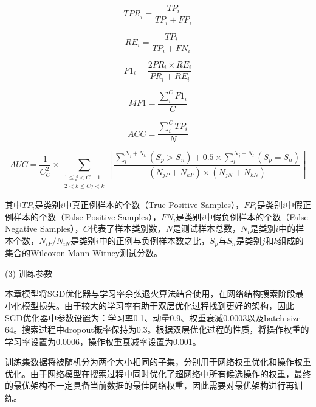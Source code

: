 \begin{equation}
    \label{deqn_ex35}
T P R_i=\frac{T P_i}{T P_i+F P_i}
\end{equation}

\begin{equation}
    \label{deqn_ex36}
R E_i=\frac{T P_i}{T P_i+F N_i}
\end{equation}

\begin{equation}
    \label{deqn_ex37}
F 1_i=\frac{2 P R_i \times R E_i}{P R_i+R E_i}
\end{equation}

\begin{equation}
    \label{deqn_ex38}
M F 1=\frac{\sum_i^C F 1_i}{C}
\end{equation}

\begin{equation}
    \label{deqn_ex39}
A C C=\frac{\sum_i^C T P_i}{N}
\end{equation}

\begin{equation}
    \label{deqn_ex310}
A U C=\frac{1}{C_C^2} \times \sum_{\substack{1 \leq j<C-1 \\ 2<k \leq C j<k}}\left[\frac{\sum_l^{N_j+N_k}\left(S_p>S_n\right)+0.5 \times \sum_l^{N_j+N_l}\left(S_p=S_n\right)}{\left(N_{j P}+N_{k P}\right) \times\left(N_{j N}+N_{k N}\right)}\right]
\end{equation}

\vspace{5mm}


其中$T P_i$是类别$i$中真正例样本的个数（True Positive Samples），$F P_i$是类别$i$中假正例样本的个数（False Positive Samples），$F N_i$是类别$i$中假负例样本的个数（False Negative Samples），$C$代表了样本类别数，$N$是测试样本总数，$N_i$是类别$i$中的样本个数，$N_{i P} / N_{i N}$是类别$i$中的正例与负例样本数之比，$S_p$与$S_n$是类别$j$和$k$组成的集合的Wilcoxon-Mann-Witney测试\cite{3-15}分数。

(3) 训练参数

本章模型将SGD优化器与学习率余弦退火算法结合使用，在网络结构搜索阶段最小化模型损失。由于较大的学习率有助于双层优化过程找到更好的架构，因此SGD优化器中参数设置为：学习率0.1、动量0.9、权重衰减0.0003以及batch size 64。搜索过程中dropout概率保持为0.3。根据双层优化过程的性质，将操作权重的学习率设置为0.0006，操作权重衰减率设置为0.001。

训练集数据将被随机分为两个大小相同的子集，分别用于网络权重优化和操作权重优化。由于网络模型在搜索过程中同时优化了超网络中所有候选操作的权重，最终的最优架构不一定具备当前数据的最佳网络权重，因此需要对最优架构进行再训练。

